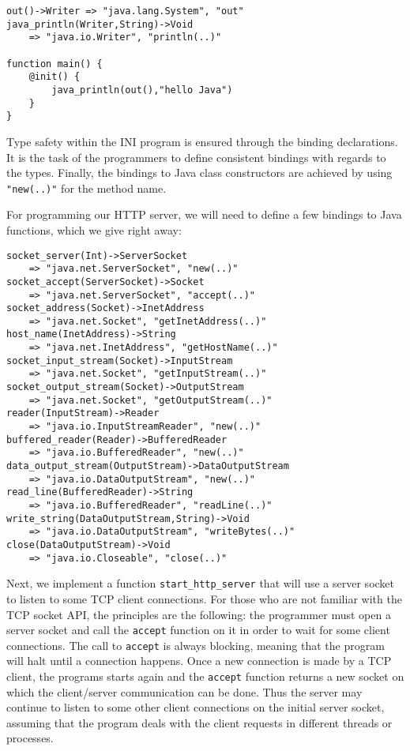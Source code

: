 \documentclass[11pt]{article}
\begin{document}
\begin{lstlisting}
out()->Writer => "java.lang.System", "out"
java_println(Writer,String)->Void
	=> "java.io.Writer", "println(..)"

function main() {
	@init() {
		java_println(out(),"hello Java")
	}
}
\end{lstlisting}

Type safety within the INI program is ensured through the binding declarations. It is the task of the programmers to define consistent bindings with regards to the types. Finally, the bindings to Java class constructors are achieved by using \texttt{"new(..)"} for the method name.

For programming our HTTP server, we will need to define a few bindings to Java functions, which we give right away:

{\small \begin{lstlisting}
socket_server(Int)->ServerSocket
	=> "java.net.ServerSocket", "new(..)"
socket_accept(ServerSocket)->Socket
	=> "java.net.ServerSocket", "accept(..)"
socket_address(Socket)->InetAddress
	=> "java.net.Socket", "getInetAddress(..)"
host_name(InetAddress)->String
	=> "java.net.InetAddress", "getHostName(..)"
socket_input_stream(Socket)->InputStream
	=> "java.net.Socket", "getInputStream(..)"
socket_output_stream(Socket)->OutputStream
	=> "java.net.Socket", "getOutputStream(..)"
reader(InputStream)->Reader
	=> "java.io.InputStreamReader", "new(..)"
buffered_reader(Reader)->BufferedReader
	=> "java.io.BufferedReader", "new(..)"
data_output_stream(OutputStream)->DataOutputStream
	=> "java.io.DataOutputStream", "new(..)"
read_line(BufferedReader)->String
	=> "java.io.BufferedReader", "readLine(..)"
write_string(DataOutputStream,String)->Void
	=> "java.io.DataOutputStream", "writeBytes(..)"
close(DataOutputStream)->Void
	=> "java.io.Closeable", "close(..)"
\end{lstlisting} }

Next, we implement a function \texttt{start\_http\_server} that will use a server socket to listen to some TCP client connections. For those who are not familiar with the TCP socket API, the principles are the following: the programmer must open a server socket and call the \texttt{accept} function on it in order to wait for some client connections. The call to \texttt{accept} is always blocking, meaning that the program will halt until a connection happens. Once a new connection is made by a TCP client, the programs starts again and the \texttt{accept} function returns a  new socket on which the client/server communication can be done. Thus the server may continue to listen to some other client connections on the initial server socket, assuming that the program deals with the client requests in different threads or processes.
\end{document}
